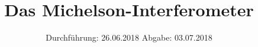 
\setlength{\parindent}{0 pt}

\subject{V401}
\title{Das Michelson-Interferometer}
\date{%
  Durchführung: 26.06.2018
  \hspace{3em}
  Abgabe: 03.07.2018
}



\maketitle
\thispagestyle{empty}
\tableofcontents
\newpage






\printbibliography{}


